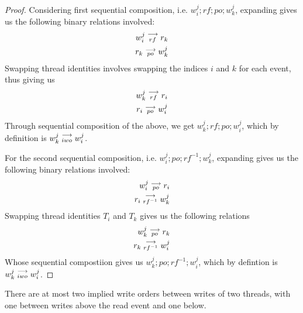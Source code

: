     \begin{proof}
        Considering first sequential composition, i.e. $w_i^j;rf;po;w_k^j$, expanding gives us the following binary relations involved:
        \begin{align}
            w_i^j\stackrel{\longrightarrow}{_{rf}}r_k \\
            r_k\stackrel{\longrightarrow}{_{po}}w_k^j
        \end{align}
        Swapping thread identities involves swapping the indices $i$ and $k$ for each event, thus giving us 
        \begin{align}
            w_k^j\stackrel{\longrightarrow}{_{rf}}r_i \\
            r_i\stackrel{\longrightarrow}{_{po}}w_i^j
        \end{align}
        Through sequential composition of the above, we get $w_k^j;rf;po;w_i^j$, which by definition is $w_k^j\stackrel{\longrightarrow}{_{iwo}}w_i^j$.

        For the second sequential composition, i.e. $w_i^j;po;rf^{-1};w_k^j$, expanding gives us the following binary relations involved:
        \begin{align}
            w_i^j\stackrel{\longrightarrow}{_{po}}r_i \\
            r_i\stackrel{\longrightarrow}{_{rf^{-1}}}w_k^j
        \end{align}
        Swapping thread identities $T_i$ and $T_k$ gives us the following relations 
        \begin{align}
            w_k^j\stackrel{\longrightarrow}{_{po}}r_k \\
            r_k\stackrel{\longrightarrow}{_{rf^{-1}}}w_i^j
        \end{align}
        Whose sequential compostiion gives us $w_k^j;po;rf^{-1};w_i^j$, which by defintion is $w_k^j\stackrel{\longrightarrow}{_{iwo}}w_i^j$.
    \end{proof}
        

    \begin{property}
        \label{prop4}
        There are at most two implied write orders between writes of two threads, with one between writes above the read event and one below. 
    \end{property}
        

